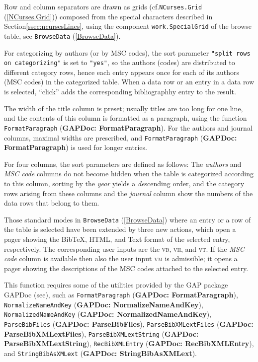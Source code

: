 \documentclass[a4paper,11pt]{report}
\begin{document}
{{{ Row and column separators are drawn as grids (cf.{\nobreakspace}\texttt{NCurses.Grid} (\ref{NCurses.Grid})) composed from the special characters described in Section{\nobreakspace}\ref{ssec:ncursesLines}, using the component \texttt{work.SpecialGrid} of the browse table, see \texttt{BrowseData} (\ref{BrowseData}). 

 For categorizing by authors (or by MSC codes), the sort parameter \texttt{"split rows on categorizing"} is set to \texttt{"yes"}, so the authors (codes) are distributed to different category rows, hence
each entry appears once for each of its authors (MSC codes) in the categorized
table. When a data row or an entry in a data row is selected, ``click'' adds the corresponding bibliographhy entry to the result. 

 The width of the title column is preset; usually titles are too long for one
line, and the contents of this column is formatted as a paragraph, using the
function \texttt{FormatParagraph} (\textbf{GAPDoc: FormatParagraph}). For the authors and journal columns, maximal widths are prescribed, and \texttt{FormatParagraph} (\textbf{GAPDoc: FormatParagraph}) is used for longer entries. 

 For four columns, the sort parameters are defined as follows: The \emph{authors} and \emph{MSC code} columns do not become hidden when the table is categorized according to this
column, sorting by the \emph{year} yields a \emph{de}scending order, and the category rows arising from these columns and the \emph{journal} column show the numbers of the data rows that belong to them. 

 Those standard modes in \texttt{BrowseData} (\ref{BrowseData}) where an entry or a row of the table is selected have been extended by three
new actions, which open a pager showing the Bib{\TeX}, HTML, and Text format of the selected entry, respectively. The corresponding
user inputs are the \textsc{vb}, \textsc{vh}, and \textsc{vt}. If the \emph{MSC code} column is available then also the user input \textsc{vm} is admissible; it opens a pager showing the descriptions of the MSC codes
attached to the selected entry. 

 This function requires some of the utilities provided by the \textsf{GAP} package \textsf{GAPDoc} (see{\nobreakspace}\cite{GAPDoc}), such as \texttt{FormatParagraph} (\textbf{GAPDoc: FormatParagraph}), \texttt{NormalizeNameAndKey} (\textbf{GAPDoc: NormalizeNameAndKey}), \texttt{NormalizedNameAndKey} (\textbf{GAPDoc: NormalizedNameAndKey}), \texttt{ParseBibFiles} (\textbf{GAPDoc: ParseBibFiles}), \texttt{ParseBibXMLextFiles} (\textbf{GAPDoc: ParseBibXMLextFiles}), \texttt{ParseBibXMLextString} (\textbf{GAPDoc: ParseBibXMLextString}), \texttt{RecBibXMLEntry} (\textbf{GAPDoc: RecBibXMLEntry}), and \texttt{StringBibAsXMLext} (\textbf{GAPDoc: StringBibAsXMLext}). 

}}}
\end{document}
